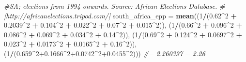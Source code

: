 \documentclass[11pt, oneside]{article}   	%
\newenvironment{Shaded}{\begin{snugshade}}{\end{snugshade}}
\newcommand{\CommentTok}[1]{\textcolor[rgb]{0.56,0.35,0.01}{\textit{#1}}}
\newcommand{\DecValTok}[1]{\textcolor[rgb]{0.00,0.00,0.81}{#1}}
\newcommand{\FloatTok}[1]{\textcolor[rgb]{0.00,0.00,0.81}{#1}}
\newcommand{\KeywordTok}[1]{\textcolor[rgb]{0.13,0.29,0.53}{\textbf{#1}}}
\newcommand{\NormalTok}[1]{#1}
\newcommand{\OperatorTok}[1]{\textcolor[rgb]{0.81,0.36,0.00}{\textbf{#1}}}
\newcommand{\StringTok}[1]{\textcolor[rgb]{0.31,0.60,0.02}{#1}}
\begin{document}
\begin{Shaded}
\begin{Highlighting}[]
{{{\CommentTok{#SA; elections from 1994 onwards. Source: African Elections Database.}
\CommentTok{#[http://africanelections.tripod.com/]}
\NormalTok{south_africa_epp =}\StringTok{ }\KeywordTok{mean}\NormalTok{((}\DecValTok{1}\OperatorTok{/}\NormalTok{(}\FloatTok{0.62}\OperatorTok{^}\DecValTok{2} \OperatorTok{+}\StringTok{ }\FloatTok{0.2039}\OperatorTok{^}\DecValTok{2} \OperatorTok{+}\StringTok{ }\FloatTok{0.104}\OperatorTok{^}\DecValTok{2} \OperatorTok{+}\StringTok{ }\FloatTok{0.022}\OperatorTok{^}\DecValTok{2} \OperatorTok{+}\StringTok{ }\FloatTok{0.07}\OperatorTok{^}\DecValTok{2} \OperatorTok{+}\StringTok{ }\FloatTok{0.015}\OperatorTok{^}\DecValTok{2}\NormalTok{)),}
\NormalTok{                        (}\DecValTok{1}\OperatorTok{/}\NormalTok{(}\FloatTok{0.66}\OperatorTok{^}\DecValTok{2} \OperatorTok{+}\StringTok{ }\FloatTok{0.096}\OperatorTok{^}\DecValTok{2} \OperatorTok{+}\StringTok{ }\FloatTok{0.086}\OperatorTok{^}\DecValTok{2} \OperatorTok{+}\StringTok{ }\FloatTok{0.069}\OperatorTok{^}\DecValTok{2} \OperatorTok{+}\StringTok{ }\FloatTok{0.034}\OperatorTok{^}\DecValTok{2} \OperatorTok{+}\StringTok{ }\FloatTok{0.14}\OperatorTok{^}\DecValTok{2}\NormalTok{)),}
\NormalTok{                        (}\DecValTok{1}\OperatorTok{/}\NormalTok{(}\FloatTok{0.69}\OperatorTok{^}\DecValTok{2} \OperatorTok{+}\StringTok{ }\FloatTok{0.124}\OperatorTok{^}\DecValTok{2} \OperatorTok{+}\StringTok{ }\FloatTok{0.0697}\OperatorTok{^}\DecValTok{2} \OperatorTok{+}\StringTok{ }\FloatTok{0.023}\OperatorTok{^}\DecValTok{2} \OperatorTok{+}\StringTok{ }\FloatTok{0.0173}\OperatorTok{^}\DecValTok{2} \OperatorTok{+}\StringTok{ }\FloatTok{0.0165}\OperatorTok{^}\DecValTok{2} \OperatorTok{+}\StringTok{ }\FloatTok{0.16}\OperatorTok{^}\DecValTok{2}\NormalTok{)),}
\NormalTok{                        (}\DecValTok{1}\OperatorTok{/}\NormalTok{(}\FloatTok{0.659}\OperatorTok{^}\DecValTok{2}\FloatTok{+0.1666}\OperatorTok{^}\DecValTok{2}\FloatTok{+0.0742}\OperatorTok{^}\DecValTok{2}\FloatTok{+0.0455}\OperatorTok{^}\DecValTok{2}\NormalTok{)))}
\CommentTok{#= 2.260397 = 2.26}

}}}
\end{Highlighting}
\end{Shaded}
\end{document}
